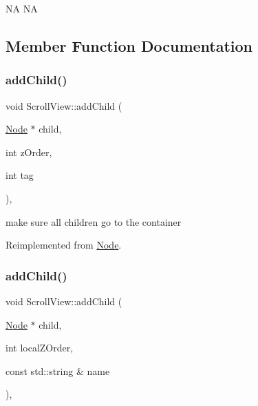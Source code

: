 NA  NA 

\subsection{Member Function Documentation}
\mbox{\label{classScrollView_a36cedf4f110c025a6fc1196f6db3cd44}} 
\subsubsection{\texorpdfstring{add\+Child()}{addChild()}\hspace{0.1cm}{\footnotesize\ttfamily [1/4]}}
{\footnotesize\ttfamily void Scroll\+View\+::add\+Child (\begin{DoxyParamCaption}\item[{\hyperlink{classNode}{Node} $\ast$}]{child,  }\item[{int}]{z\+Order,  }\item[{int}]{tag }\end{DoxyParamCaption})\hspace{0.3cm}{\ttfamily [override]}, {\ttfamily [virtual]}}

make sure all children go to the container 

Reimplemented from \hyperlink{classNode_ac29dab4b296e96c5072545cf9bd94b90}{Node}.

\mbox{\label{classScrollView_a29ff1f072b73708543aefc5f5983acba}} 
\subsubsection{\texorpdfstring{add\+Child()}{addChild()}\hspace{0.1cm}{\footnotesize\ttfamily [2/4]}}
{\footnotesize\ttfamily void Scroll\+View\+::add\+Child (\begin{DoxyParamCaption}\item[{\hyperlink{classNode}{Node} $\ast$}]{child,  }\item[{int}]{local\+Z\+Order,  }\item[{const std\+::string \&}]{name }\end{DoxyParamCaption})\hspace{0.3cm}{\ttfamily [override]}, {\ttfamily [virtual]}}

